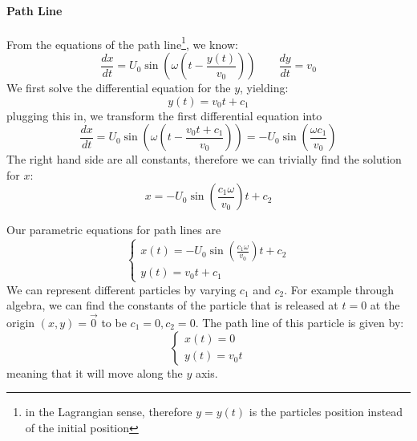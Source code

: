 \paragraph{Path Line}
From the equations of the path line\footnote{in the Lagrangian sense, therefore $y=y(t)$ is the particles position instead of the initial position}, we know:
\begin{equation*}
	\frac{dx}{dt} = U_0 \sin\left(\omega \left( t - \frac {y(t)}{v_0}\right)\right)\qquad \frac{dy}{dt} = v_0
\end{equation*}
We first solve the differential equation for the $y$, yielding:
\begin{equation*}
	y(t) = v_0 t+ c_1
\end{equation*}
plugging this in, we transform the first differential equation into
\begin{equation*}
	\frac{dx}{dt} = U_0 \sin\left(\omega \left( t - \frac {v_0t + c_1}{v_0}\right)\right)=-U_0 \sin\left(\frac {\omega c_1}{v_0}\right)
\end{equation*}
The right hand side are all constants, therefore we can trivially find the solution for $x$:
\begin{equation*}
	x = -U_0\sin\left(\frac{c_1 \omega}{v_0}\right) t + c_2
\end{equation*}

Our parametric equations for path lines are
\begin{equation*}
	\begin{cases}
		x(t) = -U_0\sin\left(\frac{c_1 \omega}{v_0}\right) t + c_2\\
		y(t) = v_0 t+ c_1
	\end{cases}
\end{equation*}
We can represent different particles by varying $c_1$ and $c_2$. For example through algebra, we can find the constants of the particle that is released at $t=0$ at the origin $(x,y)=\vec 0$ to be $c_1=0, c_2=0$.
The path line of this particle is given by:
\begin{equation*}
	\begin{cases}
		x(t) = 0\\
		y(t) = v_0 t
	\end{cases}
\end{equation*}
meaning that it will move along the $y$ axis.


